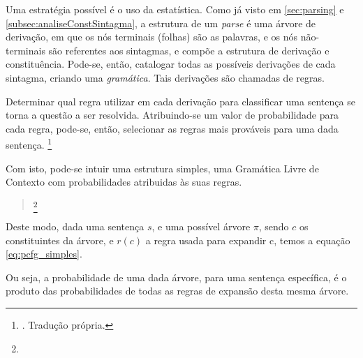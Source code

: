 Uma estratégia possível é o uso da estatística. Como já visto em \ref{sec:parsing} e \ref{subsec:analiseConstSintagma}, a estrutura de um \textit{parse} é uma árvore de derivação, em que os nós terminais (folhas) são as palavras, e os nós não-terminais são referentes aos sintagmas, e compõe a estrutura de derivação e constituência. Pode-se, então, catalogar todas as possíveis derivações de cada sintagma, criando uma \textit{gramática}. Tais derivações são chamadas de regras.

Determinar qual regra utilizar em cada derivação para classificar uma sentença se torna a questão a ser resolvida. Atribuindo-se um valor de probabilidade para cada regra, pode-se, então, selecionar as regras mais prováveis para uma dada sentença.  
\footnote{. Tradução própria.}

Com isto, pode-se intuir uma estrutura simples, uma Gramática Livre de Contexto com probabilidades atribuidas às suas regras. 
\begin{quote}
    \footnote{}
\end{quote}
    
Deste modo, dada uma sentença $s$, e uma possível árvore $\pi$, sendo $c$ os constituintes da árvore, e $r(c)$ a regra usada para expandir c, temos a equação \ref{eq:pcfg_simples}.
\begin{center}
       
\end{center}
Ou seja, a probabilidade de uma dada árvore, para uma sentença específica, é o produto das probabilidades de todas as regras de expansão desta mesma árvore.

